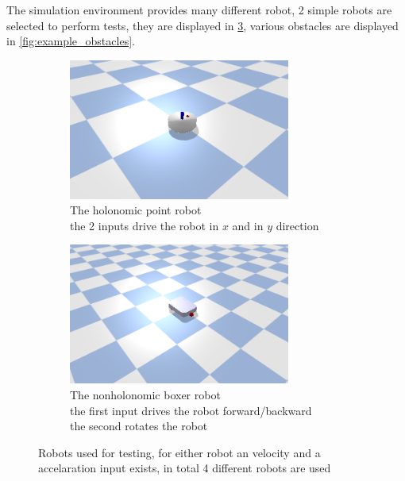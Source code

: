 The simulation environment provides many different robot, 2 simple robots are selected to perform tests, they are displayed in \cref{fig:example_robots}, various obstacles are displayed in \cref{fig:example_obstacles}.

\begin{figure}[H]
    \centering
    \begin{subfigure}{.5\textwidth}
    \centering
    \includegraphics[width=0.8\textwidth]{figures/point_robot.png}
    \caption{The holonomic point robot\\the 2 inputs drive the robot in $x$ and in $y$ direction}
    \label{subfig:example_point_robot}
    \end{subfigure}%
    \begin{subfigure}{.5\textwidth}
    \centering
    \includegraphics[width=0.8\textwidth]{figures/boxer_robot.png}
    \caption{The nonholonomic boxer robot\\the first input drives the robot forward/backward\\the second rotates the robot}
    \label{subfig:example_boxer_robot}
    \end{subfigure}%
    \caption{Robots used for testing, for either robot an velocity and a accelaration input exists, in total 4 different robots are used}
    \label{fig:example_robots}
\end{figure}

